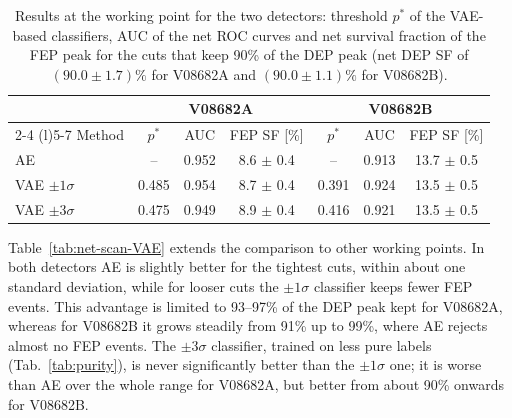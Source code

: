 \begin{table}[H]
    \centering
    \begin{tabular}{lcccccc}
        \toprule
        & \multicolumn{3}{c}{V08682A} & \multicolumn{3}{c}{V08682B} \\
        \cmidrule(lr){2-4} \cmidrule(l){5-7}
        Method & $p^*$ & \acs{AUC} & \acs{FEP} SF [\%] & $p^*$ & \acs{AUC} & \acs{FEP} SF [\%] \\
        \midrule
        \acs{AE}               & --    & 0.952 & 8.6 $\pm$ 0.4 & --    & 0.913 & 13.7 $\pm$ 0.5 \\
        \acs{VAE} $\pm1\sigma$ & 0.485 & 0.954 & 8.7 $\pm$ 0.4 & 0.391 & 0.924 & 13.5 $\pm$ 0.5 \\
        \acs{VAE} $\pm3\sigma$ & 0.475 & 0.949 & 8.9 $\pm$ 0.4 & 0.416 & 0.921 & 13.5 $\pm$ 0.5 \\
        \bottomrule
    \end{tabular}
    \caption{Results at the working point for the two detectors: threshold $p^*$ of the \ac{VAE}-based classifiers, \ac{AUC} of the net \ac{ROC} curves and net survival fraction of the \ac{FEP} peak for the cuts that keep 90\% of the \ac{DEP} peak (net \ac{DEP} SF of $(90.0 \pm 1.7)\%$ for V08682A and $(90.0 \pm 1.1)\%$ for V08682B).}
    \label{tab:VAE-working-point}
\end{table}

Table~\ref{tab:net-scan-VAE} extends the comparison to other working points. In both detectors \ac{AE} is slightly better for the tightest cuts, within about one standard deviation, while for looser cuts the $\pm1\sigma$ classifier keeps fewer \ac{FEP} events. This advantage is limited to 93--97\% of the \ac{DEP} peak kept for V08682A, whereas for V08682B it grows steadily from 91\% up to 99\%, where \ac{AE} rejects almost no \ac{FEP} events. The $\pm3\sigma$ classifier, trained on less pure labels (Tab.~\ref{tab:purity}), is never significantly better than the $\pm1\sigma$ one; it is worse than \ac{AE} over the whole range for V08682A, but better from about 90\% onwards for V08682B.

